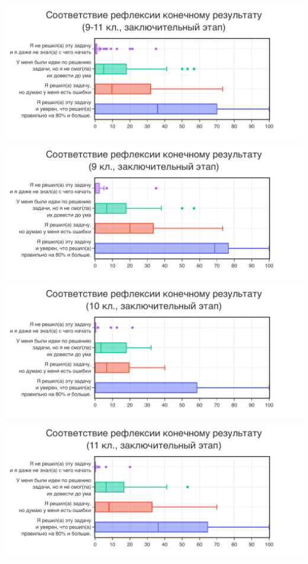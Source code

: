 \includegraphics[width=\linewidth]{../export/pdf/selfassessment/respa/allgrade-box.pdf}
\includegraphics[width=\linewidth]{../export/pdf/selfassessment/respa/grade9-box.pdf}
\includegraphics[width=\linewidth]{../export/pdf/selfassessment/respa/grade10-box.pdf}
\includegraphics[width=\linewidth]{../export/pdf/selfassessment/respa/grade11-box.pdf}

